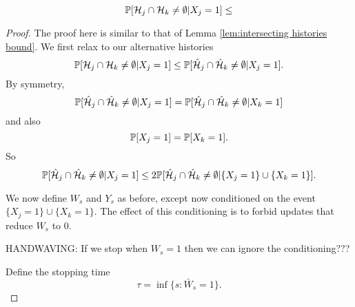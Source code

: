 \begin{lemma}
	\label{lem:intersecting histories bound given X_j = 1}
	\begin{equation}
		\mathbb{P}[\mathcal{H}_{j} \cap \mathcal{H}_k \neq \emptyset | X_j = 1] \leq 
	\end{equation}
\end{lemma}
\begin{proof}
The proof here is similar to that of Lemma \ref{lem:intersecting histories bound}. We first relax to our alternative histories
\begin{equation}
	\mathbb{P}[\mathcal{H}_{j} \cap \mathcal{H}_k \neq \emptyset | X_j = 1] \leq \mathbb{P}[\hat{\mathcal{H}}_{j} \cap \hat{\mathcal{H}}_k \neq \emptyset | X_j = 1].
\end{equation}
By symmetry, 
\begin{equation}
	\mathbb{P}[\hat{\mathcal{H}}_{j} \cap \hat{\mathcal{H}}_k \neq \emptyset | X_j = 1] = \mathbb{P}[\hat{\mathcal{H}}_{j} \cap \hat{\mathcal{H}}_k \neq \emptyset | X_k = 1]
\end{equation}
and also
\begin{equation}
	\mathbb{P}[X_j = 1] = \mathbb{P}[X_k = 1].
\end{equation}
So 
\begin{equation}
	\mathbb{P}[\hat{\mathcal{H}}_{j} \cap \hat{\mathcal{H}}_k \neq \emptyset | X_j = 1] \leq 2 \mathbb{P}[\hat{\mathcal{H}}_{j} \cap \hat{\mathcal{H}}_k \neq \emptyset | \{X_j = 1\} \cup \{X_k = 1\}].
\end{equation}

We now define $W_s$ and $Y_s$ as before, except now conditioned on the event $\{X_j = 1\} \cup \{X_k = 1\}$. The effect of this conditioning is to forbid updates that reduce $W_s$ to $0$. 

HANDWAVING: If we stop when $W_s = 1$ then we can ignore the conditioning???

Define the stopping time 
\begin{equation}
	\tau = \inf\{s: \bar{W}_s = 1\}.
\end{equation}

\end{proof}

